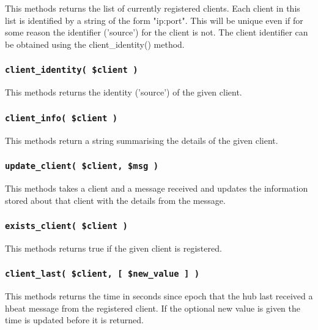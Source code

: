 This methods returns the list of currently registered clients.  Each
client in this list is identified by a string of the form "ip:port".
This will be unique even if for some reason the identifier ('source')
for the client is not.  The client identifier can be obtained using
the \textsf{client\_identity()} method.

\subsubsection*{\texttt{client\_identity( \$client )}\label{xPL::Hub_client_identity_client_}}


This methods returns the identity ('source') of the given client.

\subsubsection*{\texttt{client\_info( \$client )}\label{xPL::Hub_client_info_client_}}


This methods return a string summarising the details of the given
client.

\subsubsection*{\texttt{update\_client( \$client, \$msg )}\label{xPL::Hub_update_client_client_msg_}}


This methods takes a client and a message received and updates the information
stored about that client with the details from the message.

\subsubsection*{\texttt{exists\_client( \$client )}\label{xPL::Hub_exists_client_client_}}


This methods returns true if the given client is registered.

\subsubsection*{\texttt{client\_last( \$client, [ \$new\_value ] )}\label{xPL::Hub_client_last_client_new_value_}}


This methods returns the time in seconds since epoch that the hub last
received a hbeat message from the registered client.  If the optional
new value is given the time is updated before it is returned.

